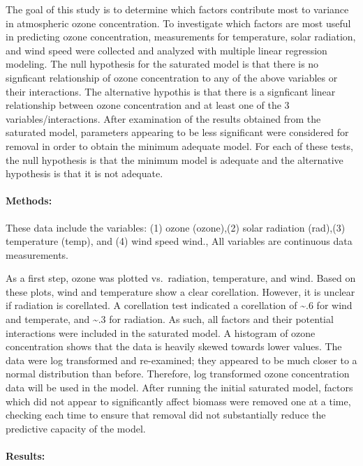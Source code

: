 \documentclass[]{article}
\let\oldparagraph\paragraph
\renewcommand{\paragraph}[1]{\oldparagraph{#1}\mbox{}}
\begin{document}
The goal of this study is to determine which factors contribute most to
variance in atmospheric ozone concentration. To investigate which
factors are most useful in predicting ozone concentration, measurements
for temperature, solar radiation, and wind speed were collected and
analyzed with multiple linear regression modeling. The null hypothesis
for the saturated model is that there is no signficant relationship of
ozone concentration to any of the above variables or their interactions.
The alternative hypothis is that there is a signficant linear
relationship between ozone concentration and at least one of the 3
variables/interactions. After examination of the results obtained from
the saturated model, parameters appearing to be less significant were
considered for removal in order to obtain the minimum adequate model.
For each of these tests, the null hypothesis is that the minimum model
is adequate and the alternative hypothesis is that it is not adequate.

\paragraph{Methods:}\label{methods-1}

These data include the variables: (1) ozone (ozone),(2) solar radiation
(rad),(3) temperature (temp), and (4) wind speed wind., All variables
are continuous data measurements.

As a first step, ozone was plotted vs.~radiation, temperature, and wind.
Based on these plots, wind and temperature show a clear corellation.
However, it is unclear if radiation is corellated. A corellation test
indicated a corellation of \textasciitilde{}.6 for wind and temperate,
and \textasciitilde{}.3 for radiation. As such, all factors and their
potential interactions were included in the saturated model. A histogram
of ozone concentration shows that the data is heavily skewed towards
lower values. The data were log transformed and re-examined; they
appeared to be much closer to a normal distribution than before.
Therefore, log transformed ozone concentration data will be used in the
model. After running the initial saturated model, factors which did not
appear to significantly affect biomass were removed one at a time,
checking each time to ensure that removal did not substantially reduce
the predictive capacity of the model.

\paragraph{Results:}\label{results-1}
\end{document}
